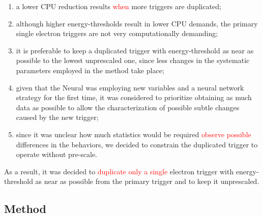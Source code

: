 \begin{enumerate}
  \item a lower CPU reduction results \textcolor{red}{when} more triggers are duplicated;
  \item although higher energy-thresholds result in lower CPU demands, the
    primary single electron triggers are not very computationally demanding;
  \item it is preferable to keep a duplicated trigger with energy-threshold as
    near as possible to the lowest unprescaled one, since less changes in the
    systematic parameters employed in the \Zee{} \tnp{} method take place;
  \item given that the Neural\rnn{} was employing new variables and a neural network
    strategy for the first time, it was considered to prioritize obtaining as
    much data as possible to allow the characterization of possible subtle
    changes caused by the new trigger;
  \item since it was unclear how much statistics would be required \textcolor{red}{observe possible} differences in the behaviors, we decided to constrain the
    duplicated trigger to operate without pre-scale.
\end{enumerate}

As a result, it was decided to \textcolor{red}{duplicate only a single} electron trigger with energy-threshold as near as possible from the primary trigger and to keep it unprescaled.


\subsection{Method}\label{top:homogeneity_method}



